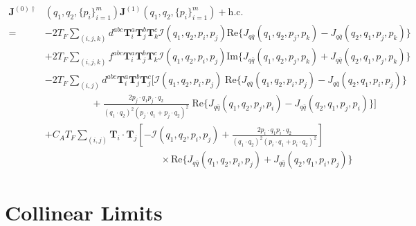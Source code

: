 \documentclass[a4paper,11pt]{article}
\begin{document}
\begin{equation}
\begin{split}
\mathbf{J}^{(0)\dagger}&(q_1, q_2,\{ p_i \}_{i=1}^m ) \mathbf{J}^{(1)}(q_1, q_2, \{ p_i \}_{i=1}^m ) + \text{h.c.} \\ 
 = &-2T_F \sum_{(i,j,k)} d^{abc} \mathbf{T}_i^a \mathbf{T}_j^b \mathbf{T}_k^c \mathcal{I}(q_1, q_2, p_i, p_j) \text{Re} \big \lbrace J_{q\bar{q}} (q_1, q_2, p_j, p_k) - J_{q \bar{q}}(q_2, q_1, p_j, p_k)  \big \rbrace  \\ 
&  +2T_F \sum_{(i,j,k)} f^{abc} \mathbf{T}_i^a \mathbf{T}_j^b \mathbf{T}_k^c \mathcal{I}(q_1, q_2, p_i, p_j) \text{Im} \big \lbrace J_{q\bar{q}} (q_1, q_2, p_j, p_k) + J_{q \bar{q}}(q_2, q_1, p_j, p_k)  \big \rbrace  \\ 
& - 2T_F \sum_{(i,j)} d^{abc} \mathbf{T}_i^a \mathbf{T}_j^b \mathbf{T}_j^c \bigg [ \mathcal{I}(q_1, q_2, p_i, p_j) \; \text{Re} \bigg \lbrace J_{q \bar{q}} (q_1, q_2, p_i, p_j) - J_{q \bar{q}} (q_2, q_1, p_i, p_j) \bigg \rbrace  \\ 
& \hspace{2cm}  + \frac{2 p_j \cdot q_1 p_j \cdot q_2}{(q_1 \cdot q_2)^2 (p_j \cdot q_1 + p_j \cdot q_2)^2}  \; \text{Re} \bigg \lbrace J_{q \bar{q}} (q_1, q_2, p_j, p_i) - J_{q \bar{q}} (q_2, q_1, p_j, p_i) \bigg \rbrace \bigg ] \\ 
& + C_A T_F \sum_{(i,j)} \mathbf{T}_i \cdot \mathbf{T}_j \left[- \mathcal{I}(q_1, q_2, p_i, p_j) + \frac{2 p_i \cdot q_1 p_i \cdot q_2}{(q_1 \cdot q_2)^2 (p_i \cdot q_1 + p_i \cdot q_2)^2} \right] \\ 
&\hspace{5cm} \times \text{Re} \bigg \lbrace J_{q \bar{q}}(q_1, q_2, p_i, p_j) + J_{q \bar{q}} (q_2, q_1, p_i, p_j) \bigg \rbrace
\end{split}
\end{equation}

\section{Collinear Limits}
\end{document}
